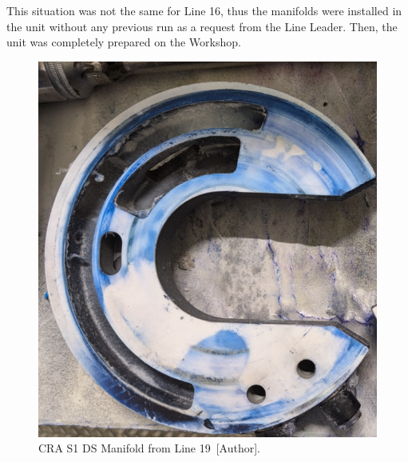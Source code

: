 This situation was not the same for Line 16, thus the manifolds were installed in the unit without any previous run as a request from the Line Leader. Then, the unit was completely prepared on the Workshop.
\begin{figure}[H]
    \centering
    \includegraphics[width=0.4\linewidth]{FIGURES/CRAMan3.png}
    \caption{CRA S1 DS Manifold from Line 19~[Author].}
    \label{CRAMan3}
\end{figure}

